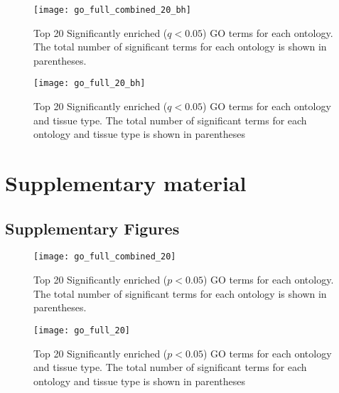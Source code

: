 \documentclass[11pt]{article}
\newcommand{\beginsupplement}{%
        \setcounter{table}{0}
        \renewcommand{\thetable}{S\arabic{table}}
        \setcounter{figure}{0}
        \renewcommand{\thefigure}{S\arabic{figure}}
        \renewcommand{\thesection}{S\arabic{section}}
        \renewcommand{\thesubsection}{S\arabic{subsection}} 
     }
\begin{document}
\clearpage

\singlespacing



\clearpage

\begin{figure}[t]
  \centering
  \texttt{[image: go\_full\_combined\_20\_bh]}
  \caption{Top 20 Significantly enriched ($q < 0.05$) GO terms for
    each ontology. The total number of significant terms for each
    ontology is shown in parentheses.}
  \label{fig:go_full_combined_20_bh}
\end{figure}


\begin{figure}[t]
  \centering
  \texttt{[image: go\_full\_20\_bh]}
  \caption{Top 20 Significantly enriched ($q < 0.05$) GO terms for
    each ontology and tissue type. The total number of significant
    terms for each ontology and tissue type is shown in parentheses}
  \label{fig:go_full_20_bh}
\end{figure}









\clearpage

\beginsupplement

\section*{Supplementary material}

\subsection*{Supplementary Figures}\label{ss:supp-fig}

\begin{figure}[t]
  \centering
  \texttt{[image: go\_full\_combined\_20]}
  \caption{Top 20 Significantly enriched ($p < 0.05$) GO terms for
    each ontology. The total number of significant terms for each
    ontology is shown in parentheses.}
  \label{fig:go_combined}
\end{figure}


\begin{figure}[t]
  \centering
  \texttt{[image: go\_full\_20]}
  \caption{Top 20 Significantly enriched ($p < 0.05$) GO terms for
    each ontology and tissue type. The total number of significant
    terms for each ontology and tissue type is shown in parentheses}
  \label{fig:go_tissue}
\end{figure}
 
\end{document}
